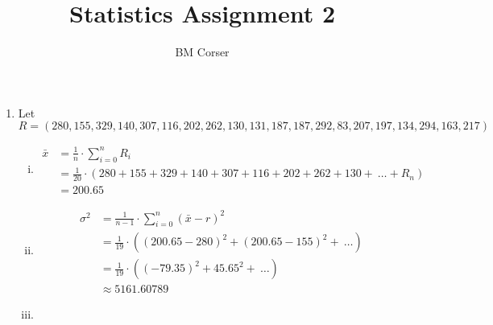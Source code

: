 \documentclass[10pt]{article}
\author{BM Corser}
\title{Statistics Assignment 2}
\begin{document}
    \maketitle 
    \begin{enumerate}
        \item Let $R = (280, 155, 329, 140, 307, 116, 202, 262, 130, 131, 187, 187, 292,
            83, 207, 197, 134, 294, 163, 217)$
            \begin{enumerate}[(i)]
            \item 
                \begin{align*}
                    \bar{x} &= \frac{1}{n}\cdot\sum_{i=0}^n R_i \\
                    &= \frac{1}{20}\cdot(280 + 155 + 329 + 140 + 307 + 116 + 202 + 262 + 130 + \ \dots + R_n) \\
                    &= 200.65
                \end{align*}
            \item 
                \begin{align*}
                    \sigma^2 &= \frac{1}{n - 1}\cdot\sum_{i=0}^n (\bar{x} - r)^2 \\
                    &= \frac{1}{19}\cdot((200.65 - 280)^2 + (200.65 - 155)^2 + \ \dots) \\
                    &= \frac{1}{19}\cdot((-79.35)^2 + 45.65^2 + \ \dots) \\
                    &\approx 5161.60789
                \end{align*}
            \item 
                
        \end{enumerate}
    \end{enumerate}
\end{document}
